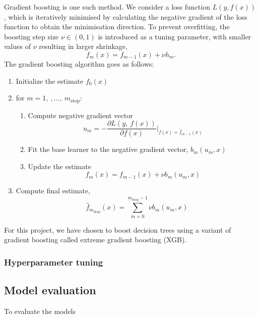 \documentclass[a4paper, 11pt, twocolumn]{article}
\begin{document}
Gradient boosting is one such method. We consider a loss function $L(y, f(x))$, 
which is iteratively minimised by calculating the negative gradient of the loss 
function to obtain the minimisation direction. To prevent overfitting, the 
boosting step size $\nu \in (0,1)$ is introduced as a tuning parameter, with 
smaller values of $\nu$ resulting in larger shrinkage, 
\begin{equation}
f_m(x)=f_{m-1}(x) + \nu h_m .  
\end{equation}
The gradient boosting algorithm goes as follows: \cite{RiccardoGB}
\begin{enumerate}[leftmargin=5mm, itemsep=0pt,  parsep=1pt]
\item Initialize the estimate $f_0(x)$
\item for $m= 1,\ ,\dots,\ m_\text{stop}$:
      \begin{enumerate}[leftmargin=5mm, itemsep=0pt,  parsep=1pt]
            \item Compute negative gradient vector 
            \begin{equation*}
                  u_m = -\frac{\partial L(y,\ f(x))}{\partial f(x)} \bigg\vert
                  _{f(x)=\hat{f}_{m-1}(x)}
            \end{equation*}
            \item Fit the base learner to the negative gradient vector, 
            $b_m(u_m, x)$
            \item Update the estimate 
            \begin{equation*}
                  f_m(x) = f_{m-1}(x) + \nu b_m (u_m, x)
            \end{equation*}
      \end{enumerate}
\item Compute final estimate, 
      \begin{equation*}
            \hat{f}_{m_\text{stop}} (x) = 
            \sum _{m=0}^{m_\text{stop}-1}\nu b_m(u_m, x)
      \end{equation*}
\end{enumerate}

For this project, we have chosen to boost decision trees using a variant of 
gradient boosting called extreme gradient boosting (XGB).


\subsubsection{Hyperparameter tuning}


\subsection{Model evaluation}
To evaluate the models 
\end{document}
